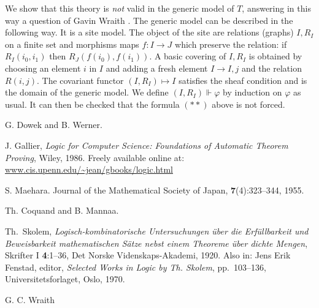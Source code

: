 \documentclass[10pt,a4paper]{article}
\begin{document}
 We show that this theory is {\em not} valid in the generic model of $T$, answering
in this way a question of Gavin Wraith \cite{Wraith}. The generic model can be described
in the following way. It is a site model. The object of the site are relations (graphs)
$I,R_I$ on a finite set
and morphisms maps $f:I\rightarrow J$ which preserve the relation: if $R_I(i_0,i_1)$
then $R_J(f(i_0),f(i_1))$. A basic covering of $I,R_I$ is obtained by choosing an element $i$
in $I$ and adding a fresh element $I\rightarrow I,j$ and the relation $R(i,j)$.
The covariant functor $(I,R_I)\longmapsto I$ satisfies the sheaf condition and is the domain
of the generic model. We define $(I,R_I)\Vdash\varphi$ by induction on $\varphi$ as usual.
It can then be checked that the formula $(**)$ above is not forced.

\begin{thebibliography}{9}

G. Dowek and B. Werner.

J. Gallier, 
\newblock\emph{Logic for Computer Science: Foundations of Automatic Theorem Proving},
Wiley, 1986. Freely available online at: \url{www.cis.upenn.edu/~jean/gbooks/logic.html}

S. Maehara.
Journal of the Mathematical Society of Japan, \textbf{7}(4):323--344, 1955.

Th. Coquand and B. Mannaa.

Th.~Skolem,
\newblock\emph{Logisch-kombinatorische Untersuchungen \"{u}ber
die Erf\"{u}llbarkeit %
und Beweisbarkeit mathematischen S\"{a}tze
nebst einem Theoreme \"{u}ber dichte Mengen},
{Skrifter} I \textbf{4}:1--36, Det Norske Videnskaps-Akademi, 1920.
\newblock Also in: Jens Erik Fenstad, editor,
\emph{Selected Works in Logic by Th. Skolem}, pp.~103--136,
Universitetsforlaget, Oslo, 1970.

G. C. Wraith

\end{thebibliography}
\end{document}
